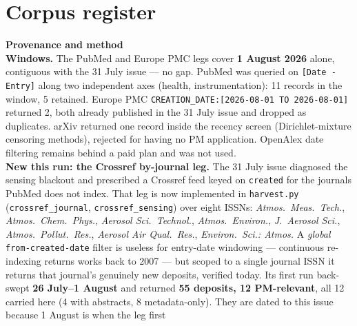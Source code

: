 \documentclass[10pt]{article}
\begin{document}
\vspace{4mm}

\section*{\sffamily\bfseries\color{Deep}Corpus register}
\vspace{-1.5mm}{\color{Amber}\rule{\linewidth}{1.1pt}}\vspace{2.5mm}



\vspace{4mm}
\begin{keybox}
{\sffamily\bfseries\footnotesize\color{Deep}Provenance and method}\\[1.2mm]
{\fontsize{7.2}{8.8}\selectfont
\textbf{Windows.} The PubMed and Europe PMC legs cover \textbf{1 August 2026} alone,
contiguous with the 31 July issue --- no gap. PubMed was queried on \texttt{[Date -
Entry]} along two independent axes (health, instrumentation): 11 records in the window,
5 retained. Europe PMC \texttt{CREATION\_DATE:[2026-08-01 TO 2026-08-01]} returned 2, both
already published in the 31 July issue and dropped as duplicates. arXiv returned one
record inside the recency screen (Dirichlet-mixture censoring methods), rejected for
having no PM application. OpenAlex date filtering remains behind a paid plan and was not
used.
\\[1.0mm]
\textbf{New this run: the Crossref by-journal leg.} The 31 July issue diagnosed the
sensing blackout and prescribed a Crossref feed keyed on \texttt{created} for the
journals PubMed does not index. That leg is now implemented in \texttt{harvest.py}
(\texttt{crossref\_journal}, \texttt{crossref\_sensing}) over eight ISSNs:
\textit{Atmos.\ Meas.\ Tech.}, \textit{Atmos.\ Chem.\ Phys.},
\textit{Aerosol Sci.\ Technol.}, \textit{Atmos.\ Environ.}, \textit{J.\ Aerosol Sci.},
\textit{Atmos.\ Pollut.\ Res.}, \textit{Aerosol Air Qual.\ Res.},
\textit{Environ.\ Sci.: Atmos.} A \emph{global} \texttt{from-created-date} filter is
useless for entry-date windowing --- continuous re-indexing returns works back to 2007 ---
but scoped to a single journal ISSN it returns that journal's genuinely new deposits,
verified today. Its first run back-swept \textbf{26 July--1 August} and returned
\textbf{55 deposits, 12 PM-relevant}, all 12 carried here (4 with abstracts,
8 metadata-only). They are dated to this issue because 1 August is when the leg first
}
\end{keybox}
\end{document}
